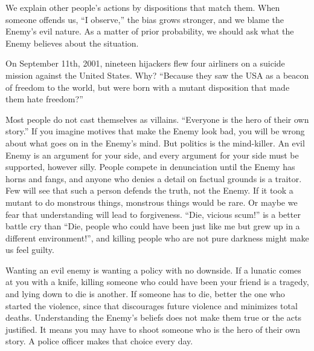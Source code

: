 
We explain other people's actions by dispositions that match them. When someone offends us, ``I observe,'' the bias grows stronger, and we blame the Enemy's evil nature.  As a matter of prior probability, we should ask what the Enemy believes about the situation.

On September 11th, 2001, nineteen hijackers flew four airliners on a suicide mission against the United States. Why? ``Because they saw the USA as a beacon of freedom to the world, but were born with a mutant disposition that made them hate freedom?'' 

Most people do not cast themselves as villains. ``Everyone is the hero of their own story.''  If you imagine motives that make the Enemy look bad, you will be wrong about what goes on in the Enemy's mind. But politics is the mind-killer. An evil Enemy is an argument for your side, and every argument for your side must be supported, however silly. People compete in denunciation until the Enemy has horns and fangs, and anyone who denies a detail on factual grounds is a traitor. Few will see that such a person defends the truth, not the Enemy. If it took a mutant to do monstrous things, monstrous things would be rare. Or maybe we fear that understanding will lead to forgiveness. ``Die, vicious scum!'' is a better battle cry than ``Die, people who could have been just like me but grew up in a different environment!'', and killing people who are not pure darkness might make us feel guilty.

Wanting an evil enemy is wanting a policy with no downside. If a lunatic comes at you with a knife, killing someone who could have been your friend is a tragedy, and lying down to die is another. If someone has to die, better the one who started the violence, since that discourages future violence and minimizes total deaths. Understanding the Enemy's beliefs does not make them true or the acts justified. It means you may have to shoot someone who is the hero of their own story. A police officer makes that choice every day.

